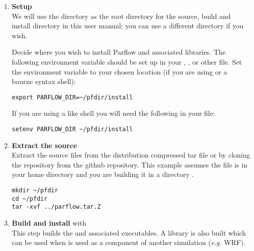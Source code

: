 \begin{enumerate}
\item {\bf Setup} \\

We will use the  directory as the root directory for the
source, build and install directory in this user manual; you can use a
different directory if you wish.

Decide where you wish to install Parflow and
associated libraries. The following environment variable should be
set up in your , , or other file. Set
the environment variable  to your chosen location
(if you are using  or a bourne syntax shell):
\begin{display}\begin{verbatim}
export PARFLOW_DIR=~/pfdir/install
\end{verbatim}\end{display}
If you are using a  like shell you will need the following in your
 file:
\begin{display}\begin{verbatim}
setenv PARFLOW_DIR ~/pfdir/install
\end{verbatim}\end{display}


\item {\bf Extract the source}\\ Extract the source files from the
distribution compressed tar file or by cloning the repository from
the \parflow{} github repository.  This example assumes the
 file is in your home directory and you are
building it in a directory .

\begin{display}\begin{verbatim}
mkdir ~/pfdir
cd ~/pfdir
tar -xvf ../parflow.tar.Z
\end{verbatim}\end{display}


\item {\bf Build and install \parflow{}} with \cmake{}\\ This step builds
the \parflow{} and associated \pftools{} executables.  A \parflow{}
library is also built which can be used when \parflow{} is used as a
component of another simulation (\emph{e.g.}  WRF).


\end{enumerate}
